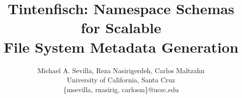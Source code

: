 \documentclass[letterpaper,twocolumn,10pt]{article}
\begin{document}
\date{}

\title{Tintenfisch: Namespace Schemas for Scalable\\File System Metadata Generation\vspace{-1em}}

\author{
{\rm Michael A. Sevilla, Reza Nasirigerdeh, Carlos Maltzahn}\\
University of California, Santa Cruz\\
\{msevilla, rnasirig, carlosm\}@ucsc.edu
} %

\maketitle








{\footnotesize 
}
\end{document}
